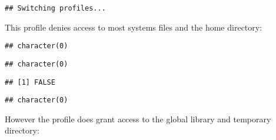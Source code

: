 


\begin{knitrout}\mycodesize
{}\color{fgcolor}\begin{kframe}
\begin{alltt}
\hlstd{(}\hlstd{)}
\end{alltt}
\begin{verbatim}
## Switching profiles...
\end{verbatim}
\end{kframe}
\end{knitrout}


This profile denies access to most systems files and the home directory:

\begin{knitrout}\mycodesize
{}\color{fgcolor}\begin{kframe}
\begin{alltt}
\hlstd{(}\hlstd{)}
\end{alltt}
\begin{verbatim}
## character(0)
\end{verbatim}
\begin{alltt}
\hlstd{(}\hlstd{)}
\end{alltt}
\begin{verbatim}
## character(0)
\end{verbatim}
\begin{alltt}
\hlstd{(}\hlstd{)}
\end{alltt}


{\ttfamily\noindent{}}\begin{verbatim}
## [1] FALSE
\end{verbatim}
\begin{alltt}
\hlstd{(}\hlstd{)}
\end{alltt}
\begin{verbatim}
## character(0)
\end{verbatim}
\end{kframe}
\end{knitrout}


However the profile does grant access to the global library and temporary directory:

